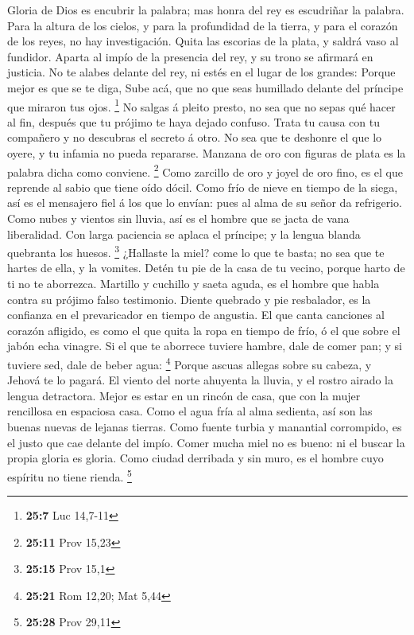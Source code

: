  Gloria de Dios es encubrir la palabra; mas honra del rey es
escudriñar la palabra.  Para la altura de los cielos, y para
la profundidad de la tierra, y para el corazón de los reyes, no hay
investigación.  Quita las escorias de la plata, y saldrá
vaso al fundidor.  Aparta al impío de la presencia del rey,
y su trono se afirmará en justicia.  No te alabes delante
del rey, ni estés en el lugar de los grandes:  Porque mejor
es que se te diga, Sube acá, que no que seas humillado delante del
príncipe que miraron tus ojos. \footnote{\textbf{25:7} Luc 14,7-11}
 No salgas á pleito presto, no sea que no sepas qué hacer al
fin, después que tu prójimo te haya dejado confuso.  Trata
tu causa con tu compañero y no descubras el secreto á otro.
 No sea que te deshonre el que lo oyere, y tu infamia no
pueda repararse.  Manzana de oro con figuras de plata es la
palabra dicha como conviene. \footnote{\textbf{25:11} Prov 15,23}
 Como zarcillo de oro y joyel de oro fino, es el que
reprende al sabio que tiene oído dócil.  Como frío de nieve
en tiempo de la siega, así es el mensajero fiel á los que lo envían:
pues al alma de su señor da refrigerio.  Como nubes y
vientos sin lluvia, así es el hombre que se jacta de vana liberalidad.
 Con larga paciencia se aplaca el príncipe; y la lengua
blanda quebranta los huesos. \footnote{\textbf{25:15} Prov 15,1}
 ¿Hallaste la miel? come lo que te basta; no sea que te
hartes de ella, y la vomites.  Detén tu pie de la casa de
tu vecino, porque harto de ti no te aborrezca.  Martillo y
cuchillo y saeta aguda, es el hombre que habla contra su prójimo falso
testimonio.  Diente quebrado y pie resbalador, es la
confianza en el prevaricador en tiempo de angustia.  El que
canta canciones al corazón afligido, es como el que quita la ropa en
tiempo de frío, ó el que sobre el jabón echa vinagre.  Si
el que te aborrece tuviere hambre, dale de comer pan; y si tuviere sed,
dale de beber agua: \footnote{\textbf{25:21} Rom 12,20; Mat 5,44}
 Porque ascuas allegas sobre su cabeza, y Jehová te lo
pagará.  El viento del norte ahuyenta la lluvia, y el
rostro airado la lengua detractora.  Mejor es estar en un
rincón de casa, que con la mujer rencillosa en espaciosa casa.
 Como el agua fría al alma sedienta, así son las buenas
nuevas de lejanas tierras.  Como fuente turbia y manantial
corrompido, es el justo que cae delante del impío.  Comer
mucha miel no es bueno: ni el buscar la propia gloria es gloria.
 Como ciudad derribada y sin muro, es el hombre cuyo
espíritu no tiene rienda. \footnote{\textbf{25:28} Prov 29,11}

